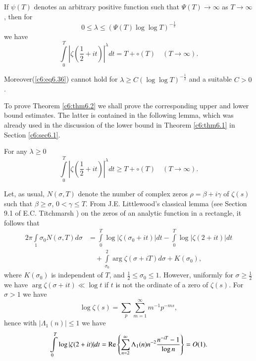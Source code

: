 \begin{thm}\label{c6:thm6.2}
If $\psi (T)$ denotes an arbitrary positive function such that $\Psi
(T) \to \infty$ as $T \to \infty$, then for  
$$
0 \leq \lambda \leq (\Psi (T) \log \log T)^{-\frac{1}{2}}
$$
we have
\begin{equation}
\int\limits^T_0 \left|\zeta \left(\frac{1}{2} + it
\right)\right|^\lambda dt = T + \circ (T) \quad (T \to
\infty).\label{c6:eq6.36} 
\end{equation}

Moreover\pageoriginale (\ref{c6:eq6.36}) cannot hold for $\lambda \geq
C (\log \log T)^{-\frac{1}{2}}$ and a suitable $C>0$. 
\end{thm}

To prove Theorem \ref{c6:thm6.2} we shall prove the corresponding
upper and lower bound estimates. The latter is contained in the
following lemma, which was already used in the discussion of the lower
bound in Theorem \ref{c6:thm6.1} in Section \ref{c6:sec6.1}. 

\begin{lemma}\label{c6:lem6.7}
For any $\lambda \geq 0$
\begin{equation}
\int\limits^T_0 \left|\zeta \left(\frac{1}{2} +
it\right)\right|^\lambda dt \geq T + \circ (T) \quad (T \to \infty)
. \label{c6:eq6.37} 
\end{equation}
\end{lemma}

\medskip
{}
Let, as usual, $N(\sigma, T)$ denote the number of complex zeros $\rho
= \beta + i\gamma$ of $\zeta(s)$ such that $\beta \geq \sigma$, $0 <
\gamma \leq T$. From J.E. Littlewood's classical lemma (see Section
9.1 of E.C. Titchmarsh \cite{Titchmarsh1}) on the zeros of an analytic
function in a rectangle, it follows that 
\begin{align*}  
2\pi \int\limits_1{\sigma_0} N (\sigma, T) d \sigma & =
\int\limits^T_0 \log |\zeta(\sigma_0 + it)| dt  - \int\limits^T_0
\log |\zeta(2+it)| dt\\ 
&\quad + \int\limits^{2}_{\sigma_0} \arg \zeta(\sigma + iT) d \sigma + 
K(\sigma_0), 
\end{align*}
where $K(\sigma_0)$ is independent of $T$, and $\frac{1}{2} \leq
\sigma_0 \leq 1$. However, uniformly for $\sigma \geq \frac{1}{2}$ we
have $\arg \zeta(\sigma + it) \ll \log t$ if $t$ is not the ordinate
of a zero of $\zeta(s)$. For $\sigma >1$ we have  
$$
\log \zeta(s) = \sum\limits_p \sum\limits^\infty_{m=1} m^{-1} p^{-ms}, 
$$
hence with $|\Lambda_1(n)| \leq 1$ we have
$$
\int\limits^T_0 \log |\zeta(2 + it)| dt = \operatorname{Re} \left\{
\sum\limits^\infty_{n=2} \Lambda_1(n) n^{-2} \frac{n^{-iT} -1}{\log n}
\right\} = O(1). 
$$

